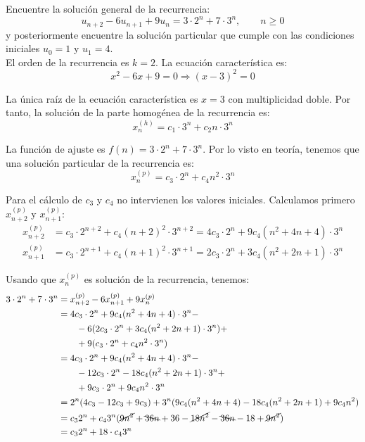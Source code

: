 \begin{ejercicio}
    Encuentre la solución general de la recurrencia:
    \begin{equation*}
        u_{n+2} - 6u_{n+1} + 9u_n = 3\cdot 2^n + 7\cdot 3^n,\qquad n\geq 0
    \end{equation*}
    y posteriormente encuentre la solución particular que cumple con las condiciones iniciales $u_0 = 1$ y $u_1 = 4$.\\

    El orden de la recurrencia es $k=2$. La ecuación característica es:
    \begin{equation*}
        x^2 - 6x + 9 = 0 \Longrightarrow (x-3)^2 = 0
    \end{equation*}

    La única raíz de la ecuación característica es $x=3$ con multiplicidad doble. Por tanto, la solución de la parte homogénea de la recurrencia es:
    \begin{equation*}
        x_n^{(h)} = c_1\cdot 3^n + c_2n\cdot 3^n
    \end{equation*}

    La función de ajuste es $f(n) = 3\cdot 2^n + 7\cdot 3^n$. Por lo visto en teoría, tenemos que
    una solución particular de la recurrencia es:
    \begin{equation*}
        x_n^{(p)} = c_3\cdot 2^n + c_4n^2\cdot 3^n
    \end{equation*}

    Para el cálculo de $c_3$ y $c_4$ no intervienen los valores iniciales.
    Calculamos primero $x_{n+2}^{(p)}$ y $x_{n+1}^{(p)}$:
    \begin{align*}
        x_{n+2}^{(p)} &= c_3\cdot 2^{n+2} + c_4(n+2)^2\cdot 3^{n+2} = 4c_3\cdot 2^n + 9c_4(n^2+4n+4)\cdot 3^{n} \\
        x_{n+1}^{(p)} &= c_3\cdot 2^{n+1} + c_4(n+1)^2\cdot 3^{n+1} = 2c_3\cdot 2^n + 3c_4(n^2+2n+1)\cdot 3^{n}
    \end{align*}

    Usando que $x_n^{(p)}$ es solución de la recurrencia, tenemos:
    \begin{align*}
        3\cdot 2^n + 7\cdot 3^n &= x_{n+2}^{(p)} - 6x_{n+1}^{(p)} + 9x_n^{(p)} \\
        &= 4c_3\cdot 2^n + 9c_4(n^2+4n+4)\cdot 3^{n} -\\&\qquad - 6(2c_3\cdot 2^n + 3c_4(n^2+2n+1)\cdot 3^{n}) +\\&\qquad + 9(c_3\cdot 2^n + c_4n^2\cdot 3^{n}) \\
        &= 4c_3\cdot 2^n + 9c_4(n^2+4n+4)\cdot 3^{n} -\\&\qquad - 12c_3\cdot 2^n - 18c_4(n^2+2n+1)\cdot 3^{n} +\\&\qquad + 9c_3\cdot 2^n + 9c_4n^2\cdot 3^{n} \\
        &= 2^n (4c_3 - 12c_3 + 9c_3) + 3^n(9c_4(n^2+4n+4) - 18c_4(n^2+2n+1) + 9c_4n^2) \\
        &= c_32^n + c_43^n(\cancel{9n^2} + \bcancel{36n} + 36 - \cancel{18n^2} - \bcancel{36n} - 18 + \cancel{9n^2}) \\
        &= c_32^n + 18\cdot c_43^n
    \end{align*}


\end{ejercicio}

